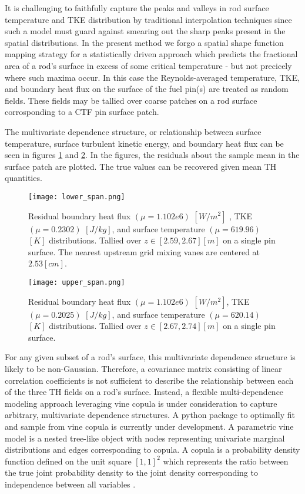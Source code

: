 \documentclass{anstrans}
\begin{document}
It is challenging to faithfully capture the peaks and valleys in
rod surface temperature and TKE distribution by traditional interpolation
techniques since such a model must guard against smearing out the sharp peaks
present in the spatial distributions.  
In the present method we forgo a spatial shape function mapping strategy
for a statistically driven approach which predicts the fractional
area of a rod's surface in excess of some critical temperature - but not
precicely where such maxima occur.
In this case the Reynolds-averaged temperature,
TKE, and boundary heat flux on the surface of the fuel pin(s) are treated
as random fields.  These fields may be tallied over coarse patches on a rod surface corrosponding
to a CTF pin surface patch.

The multivariate dependence structure, or relationship between surface temperature, surface
turbulent kinetic energy,
and boundary heat flux can be seen in figures \ref{fig:lower_seg} and
\ref{fig:upper_seg}.  In the figures, the residuals about the sample mean in
the surface patch are plotted.  The true values can be recovered given mean TH
quantities.

\begin{figure}[h]
  \texttt{[image: lower\_span.png]}
  \caption{    Residual boundary heat flux $(\mu=1.102e6)$ $[W/m^2]$ , TKE $(\mu=0.2302)$ $[J/kg]$, and surface temperature
    $(\mu=619.96)$ $[K]$ distributions.  Tallied over $z\in[2.59,2.67][m]$ on a single pin
    surface. The nearest upstream grid mixing vanes are centered at $2.53[cm]$.}
    \label{fig:lower_seg}
\end{figure}

\begin{figure}[h]
  \texttt{[image: upper\_span.png]}
  \caption{    Residual boundary heat flux $(\mu=1.102e6)$ $[W/m^2]$, TKE $(\mu=0.2025)$ $[J/kg]$, and surface temperature
    $(\mu=620.14)$ $[K]$ distributions.  Tallied over $z\in[2.67,2.74][m]$ on a single pin surface.
  }
    \label{fig:upper_seg}
\end{figure}

For any given subset of a rod's surface, this multivariate dependence structure is likely to
be non-Gaussian. Therefore, a covariance matrix consisting of linear correlation coefficients is not sufficient
to describe the relationship between each of the three TH fields on a rod's
surface.  Instead, a flexible multi-dependence modeling approach leveraging
vine copula is under consideration to capture arbitrary, multivariate
dependence structures.  A python package to optimally fit and sample from vine
copula is currently under development.  A parametric vine model is a nested
tree-like object with nodes representing univariate marginal distributions and
edges corresponding to copula.  A copula is a probability density function
defined on the unit square $[1, 1]^2$ which represents the ratio between the true
joint probability density to the joint density corresponding to independence between
all variables \cite{joe2015}.
\end{document}
